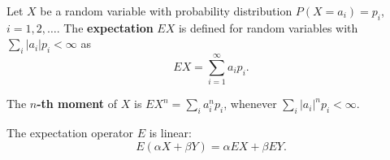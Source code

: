 Let $X$ be a random variable with probability distribution $P(X = a_i) = p_i$, $i = 1, 2, \ldots$. The \textbf{expectation} $EX$ is defined for random variables with $\sum_i |a_i| p_i < \infty$ as
$$EX = \sum_{i=1}^{\infty} a_i p_i.$$

The \textbf{$n$-th moment} of $X$ is $EX^n = \sum_i a_i^n p_i$, whenever $\sum_i |a_i|^n p_i < \infty$.

The expectation operator $E$ is linear:
$$E(\alpha X + \beta Y) = \alpha EX + \beta EY.$$
